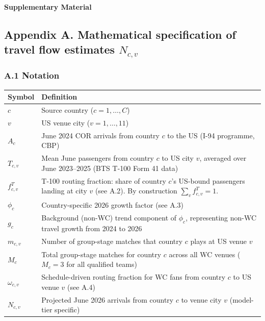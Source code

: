 \documentclass[12pt, a4paper]{article}
\newcounter{suppfig}
\begin{document}



\newpage

\begin{center}
{\large\bfseries Supplementary Material}
\end{center}

\setcounter{suppfig}{0}

\subsection*{Appendix A. Mathematical specification of travel flow
estimates $N_{c,v}$}

\subsubsection*{A.1 Notation}

\begin{center}
\small
\begin{tabular}{p{2.2cm} p{10cm}}
\toprule
\textbf{Symbol} & \textbf{Definition} \\
\midrule
$c$ & Source country ($c = 1,\ldots,C$) \\
$v$ & US venue city ($v = 1,\ldots,11$) \\
$A_c$ & June 2024 COR arrivals from country $c$ to the US
        (I-94 programme, CBP) \\
$T_{c,v}$ & Mean June passengers from country $c$ to US city $v$,
        averaged over June 2023--2025 (BTS T-100 Form 41 data) \\
$f_{c,v}^{T}$ & T-100 routing fraction: share of country $c$'s
        US-bound passengers landing at city $v$ (see A.2).
        By construction $\sum_{v} f_{c,v}^{T} = 1$. \\
$\phi_c$ & Country-specific 2026 growth factor (see A.3) \\
$g_c$ & Background (non-WC) trend component of $\phi_c$,
        representing non-WC travel growth from 2024 to 2026 \\
$m_{c,v}$ & Number of group-stage matches that country $c$
        plays at US venue $v$ \\
$M_c$ & Total group-stage matches for country $c$ across all WC venues ($M_c = 3$ for all qualified teams) \\
$\omega_{c,v}$ & Schedule-driven routing fraction for WC fans
        from country $c$ to US venue $v$ (see A.4) \\
$N_{c,v}$ & Projected June 2026 arrivals from country $c$
        to venue city $v$ (model-tier specific) \\
\bottomrule
\end{tabular}
\end{center}
\end{document}
